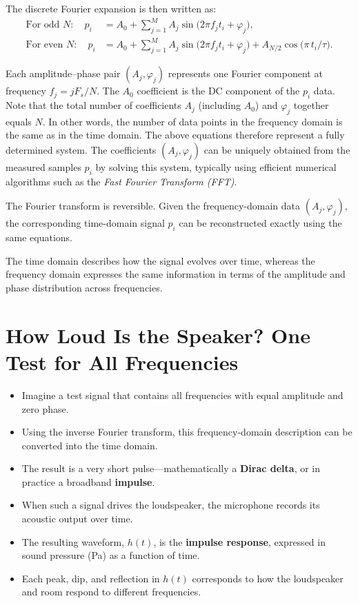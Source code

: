 \documentclass[12pt,a4paper]{article}
\begin{document}
The discrete Fourier expansion is then written as:
\begin{align}
\text{For odd } N:\quad
p_i &= A_0 + \sum_{j=1}^{M} A_j \sin\!\big(2\pi f_j t_i + \varphi_j\big), \\[6pt]
\text{For even } N:\quad
p_i &= A_0 + \sum_{j=1}^{M} A_j \sin\!\big(2\pi f_j t_i + \varphi_j\big)
      + A_{N/2}\cos\!\big(\pi\, t_i / \tau\big).
\end{align}

Each amplitude–phase pair \((A_j, \varphi_j)\) represents one Fourier component at frequency \(f_j = jF_s/N\). The $A_0$ coefficient is the DC component of the $p_i$ data. Note that the total number of coefficients $A_j$ (including $A_0$) and $\varphi_j$ together equals \(N\). In other words, the number of data points in the frequency domain is the same as in the time domain. The above equations therefore represent a fully determined system. The coefficients \((A_j, \varphi_j)\) can be uniquely obtained from the measured samples \(p_i\) by solving this system, typically using efficient numerical algorithms such as the
\emph{Fast Fourier Transform (FFT)}.

The Fourier transform is reversible. Given the frequency-domain data \((A_j, \varphi_j)\),
the corresponding time-domain signal \(p_i\) can be reconstructed exactly using the same equations.

The time domain describes how the signal evolves over time, whereas the frequency domain expresses
the same information in terms of the amplitude and phase distribution across frequencies.


\section{How Loud Is the Speaker? One Test for All Frequencies}

\begin{itemize}[noitemsep]
    \item Imagine a test signal that contains all frequencies with equal amplitude and zero phase.
    \item Using the inverse Fourier transform, this frequency-domain description can be converted into the time domain.
    \item The result is a very short pulse—mathematically a \textbf{Dirac delta}, or in practice a broadband \textbf{impulse}.
    \item When such a signal drives the loudspeaker, the microphone records its acoustic output over time.
    \item The resulting waveform, \(h(t)\), is the \textbf{impulse response}, expressed in sound pressure (Pa) as a function of time.
    \item Each peak, dip, and reflection in \(h(t)\) corresponds to how the loudspeaker and room respond to different frequencies.
\end{itemize}
\end{document}
